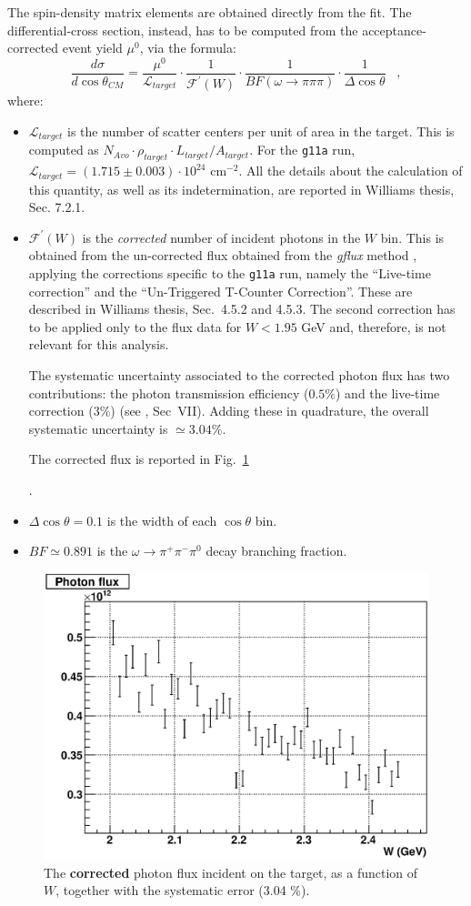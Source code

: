 \documentclass[a4paper,10pt]{report}
\begin{document}
The spin-density matrix elements are obtained directly from the fit. 
The differential-cross section, instead, has to be computed from the acceptance-corrected event yield $\mu^0$, via the formula:
\begin{equation}
\frac{d\sigma}{d\cos\theta_{CM}} = \frac{\mu^0}{\mathcal{L}_{target}} \cdot \frac{1}{\mathcal{F}^\prime (W)} \cdot  \frac{1}{BF(\omega\rightarrow \pi \pi \pi)} \cdot \frac{1}{\Delta\cos\theta} \; \; \; ,
\end{equation}
where:
\begin{itemize}
\item{$\mathcal{L}_{target}$ is the number of scatter centers per unit of area in the target. This is computed as $N_{Avo} \cdot \rho_{target} \cdot L_{target} / A_{target}$. For the \texttt{g11a} run, $\mathcal{L}_{target}=(1.715\pm 0.003)\cdot 10^{24}$ cm$^{-2}$. 
All the details about the calculation of this quantity, as well as its indetermination, are reported in Williams thesis, Sec. 7.2.1.}
\item{$\mathcal{F}^\prime(W)$ is the \textit{corrected} number of incident photons in the $W$ bin.
This is obtained from the un-corrected flux obtained from the \textit{gflux} method \cite{gflux}, applying the corrections specific to the \texttt{g11a} run, namely the ``Live-time correction'' and the ``Un-Triggered T-Counter Correction''. 
These are described in Williams thesis, Sec.~4.5.2 and 4.5.3. The second correction has to be applied only to the flux data for $W<1.95$ GeV and, therefore, is not relevant for this analysis.

The systematic uncertainty associated to the corrected photon flux has two contributions: the photon transmission efficiency ($0.5\%$) and the live-time correction ($3\%$) (see \cite{Williams:2009ab}, Sec~VII).
Adding these in quadrature, the overall systematic uncertainty is $\simeq 3.04\%$.


The corrected flux is reported in Fig.~\ref{fig:flux}}.
\item{$\Delta \cos \theta = 0.1$ is the width of each $\cos \theta$ bin.}
\item{$BF \simeq 0.891$ is the $\omega \rightarrow \pi^+ \pi^- \pi^0$ decay branching fraction.} 
\end{itemize}
\begin{figure}[tpb]
\centering
\includegraphics[width=.7 \textwidth]{xsec/flux.eps}
\caption{\label{fig:flux} The \textbf{corrected} photon flux incident on the target, as a function of $W$, together with the systematic error (3.04 $\%$).}
\end{figure}
\end{document}
